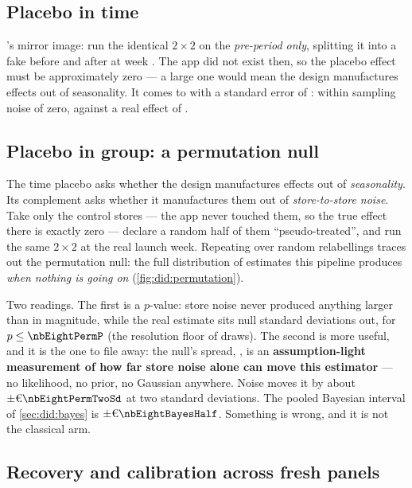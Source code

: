 \subsection*{Placebo in time}

's mirror image: run the identical $2 \times 2$ on the \emph{pre-period only},
splitting it into a fake before and after at week \nbEightPlaceboTimeWeek. The app did not exist
then, so the placebo effect must be approximately zero --- a large one would mean the design
manufactures effects out of seasonality. It comes to \eur{\nbEightPlaceboTime} with a standard error
of \eur{\nbEightPlaceboTimeSe}: within sampling noise of zero, against a real effect of
\eur{\nbEightAttCl}.

\subsection*{Placebo in group: a permutation null}

The time placebo asks whether the design manufactures effects out of \emph{seasonality}. Its
complement asks whether it manufactures them out of \emph{store-to-store noise}. Take only the
control stores --- the app never touched them, so the true effect there is exactly zero --- declare
a random half of them ``pseudo-treated'', and run the same $2 \times 2$ at the real launch week.
Repeating over \nbEightPermN{} random relabellings traces out the permutation null: the full
distribution of estimates this pipeline produces \emph{when nothing is going on}
(\cref{fig:did:permutation}).



Two readings. The first is a $p$-value: store noise never produced anything larger than
\eur{\nbEightPermMax} in magnitude, while the real estimate sits \nbEightPermZ{} null standard
deviations out, for $p \le \nbEightPermP$ (the resolution floor of \nbEightPermN{} draws). The
second is more useful, and it is the one to file away: the null's spread, \eur{\nbEightPermSd}, is
an \textbf{assumption-light measurement of how far store noise alone can move this estimator} ---
no likelihood, no prior, no Gaussian anywhere. Noise moves it by about $\pm\eur{\nbEightPermTwoSd}$ at two standard
deviations. The pooled Bayesian interval of \cref{sec:did:bayes} is $\pm\eur{\nbEightBayesHalf}$.
Something is wrong, and it is not the classical arm.

\subsection*{Recovery and calibration across fresh panels}

